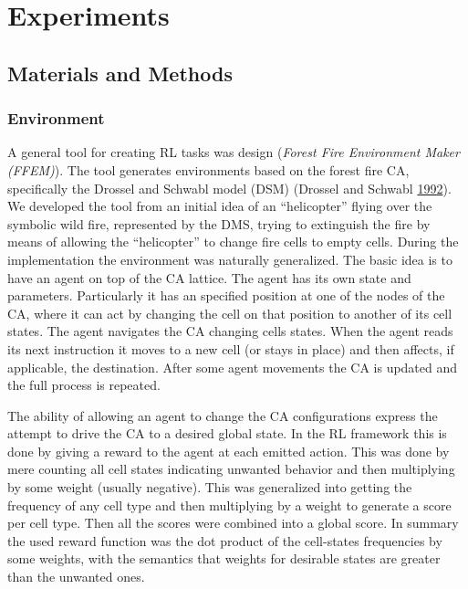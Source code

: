 \documentclass[
]{book}
\begin{document}
\hypertarget{experiments}{%
\chapter{Experiments}\label{experiments}}

\hypertarget{materials-and-methods}{%
\section{Materials and Methods}\label{materials-and-methods}}

\hypertarget{environment}{%
\subsection{Environment}\label{environment}}

A general tool for creating RL tasks was design (\emph{Forest Fire Environment Maker (FFEM)}). The tool generates environments based on the forest fire CA, specifically the Drossel and Schwabl model (DSM) (Drossel and Schwabl \protect\hyperlink{ref-drossel1992self}{1992}). We developed the tool from an initial idea of an ``helicopter'' flying over the symbolic wild fire, represented by the DMS, trying to extinguish the fire by means of allowing the ``helicopter'' to change fire cells to empty cells. During the implementation the environment was naturally generalized. The basic idea is to have an agent on top of the CA lattice. The agent has its own state and parameters. Particularly it has an specified position at one of the nodes of the CA, where it can act by changing the cell on that position to another of its cell states. The agent navigates the CA changing cells states. When the agent reads its next instruction it moves to a new cell (or stays in place) and then affects, if applicable, the destination. After some agent movements the CA is updated and the full process is repeated.

The ability of allowing an agent to change the CA configurations express the attempt to drive the CA to a desired global state. In the RL framework this is done by giving a reward to the agent at each emitted action. This was done by mere counting all cell states indicating unwanted behavior and then multiplying by some weight (usually negative). This was generalized into getting the frequency of any cell type and then multiplying by a weight to generate a score per cell type. Then all the scores were combined into a global score. In summary the used reward function was the dot product of the cell-states frequencies by some weights, with the semantics that weights for desirable states are greater than the unwanted ones.
\end{document}
